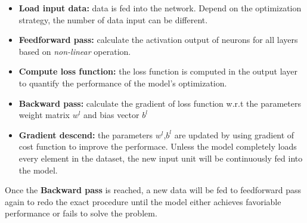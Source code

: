 \begin{itemize}
	\item \textbf{Load input data:} data is fed into the network. Depend on the optimization strategy, the number of data input can be different.
	\item \textbf{Feedforward pass:} calculate the activation output of neurons for all layers based on \textit{non-linear} operation.
	\item \textbf{Compute loss function:} the loss function is computed in the output layer to quantify the performance of the model's optimization.
	\item \textbf{Backward pass:} calculate the gradient of loss function w.r.t the parameters weight matrix $w^{l}$ and bias vector $b^{l}$
	\item \textbf{Gradient descend:} the parameters $w^{l}$,$b^{l}$ are updated by using gradient of cost function to improve the performace. Unless the model completely loads every element in the dataset, the new input unit will be continuously fed into the model.
\end{itemize}
Once the \textbf{Backward pass} is reached, a new data will be fed to feedforward pass again to redo the exact procedure until the model either achieves favoriable performance or fails to solve the problem.

